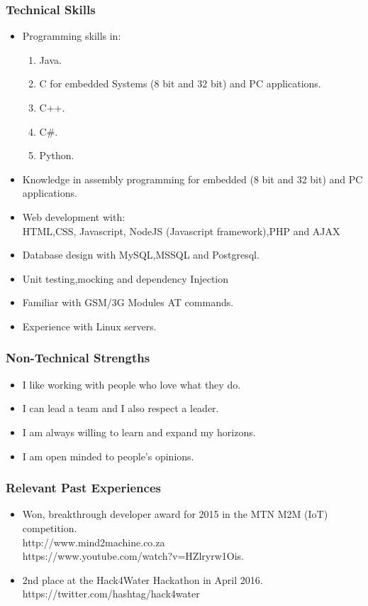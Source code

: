 \documentclass[a4paper,12pt]{article}
\begin{document}
\subsubsection{Technical Skills}
\begin{itemize}
\item Programming skills in:
\begin{enumerate}
\item Java.
\item C for embedded Systems (8 bit and 32 bit) and PC applications.
\item C++.
\item C\#.
\item Python.
\end{enumerate}
\item Knowledge in assembly programming for embedded (8 bit and 32 bit) and PC applications.
\item Web development with:\\
HTML,CSS, Javascript, NodeJS (Javascript framework),PHP and AJAX
\item Database design with MySQL,MSSQL and Postgresql.
\item Unit testing,mocking and dependency Injection
\item Familiar with GSM/3G Modules AT commands.
\item Experience with Linux servers.
\end{itemize}
\subsubsection{Non-Technical Strengths}
\begin{itemize}
\item I like working with people who love what they do.
\item I can lead a team and I also respect a leader.
\item I am always willing to learn and expand my horizons.
\item I am open minded to people's opinions.
\end{itemize}
\subsubsection{Relevant Past Experiences}
\begin{itemize}
\item Won, breakthrough developer award for 2015 in the MTN M2M (IoT) competition.\\
http://www.mind2machine.co.za \\
https://www.youtube.com/watch?v=HZlryrw1Ois.
\item 2nd place at the Hack4Water Hackathon in April 2016.\\
https://twitter.com/hashtag/hack4water
\end{itemize}
\end{document}
